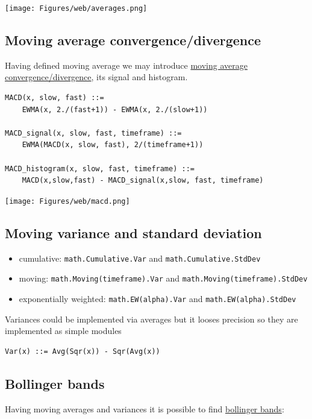 \documentclass[a4paper,11pt]{article}
\begin{document}
\centerline{\texttt{[image: Figures/web/averages.png]}}

\subsection{Moving average
convergence/divergence}\label{moving-average-convergencedivergence}

Having defined moving average we may introduce
\href{http://en.wikipedia.org/wiki/MACD}{moving average
convergence/divergence}, its signal and histogram. 
\begin{verbatim}
MACD(x, slow, fast) ::= 
    EWMA(x, 2./(fast+1)) - EWMA(x, 2./(slow+1))

MACD_signal(x, slow, fast, timeframe) ::= 
    EWMA(MACD(x, slow, fast), 2/(timeframe+1))

MACD_histogram(x, slow, fast, timeframe) ::= 
    MACD(x,slow,fast) - MACD_signal(x,slow, fast, timeframe)
\end{verbatim}

\centerline{\texttt{[image: Figures/web/macd.png]}}

\subsection{Moving variance and standard deviation}\label{moving-variance}

\begin{itemize}
\itemsep1pt\parskip0pt
\item
  cumulative: \texttt{math.Cumulative.Var} and \texttt{math.Cumulative.StdDev}
\item
  moving: \texttt{math.Moving(timeframe).Var} and \texttt{math.Moving(timeframe).StdDev}
\item
  exponentially weighted: \texttt{math.EW(alpha).Var} and \texttt{math.EW(alpha).StdDev}
\end{itemize}
Variances could be implemented via averages but it looses precision so they
are implemented as simple modules

\begin{verbatim}
Var(x) ::= Avg(Sqr(x)) - Sqr(Avg(x))
\end{verbatim}


\subsection{Bollinger bands}\label{bollinger-bands}

Having moving averages and variances it is possible to find
\href{http://en.wikipedia.org/wiki/Bollinger_Bands}{bollinger bands}:
\end{document}
